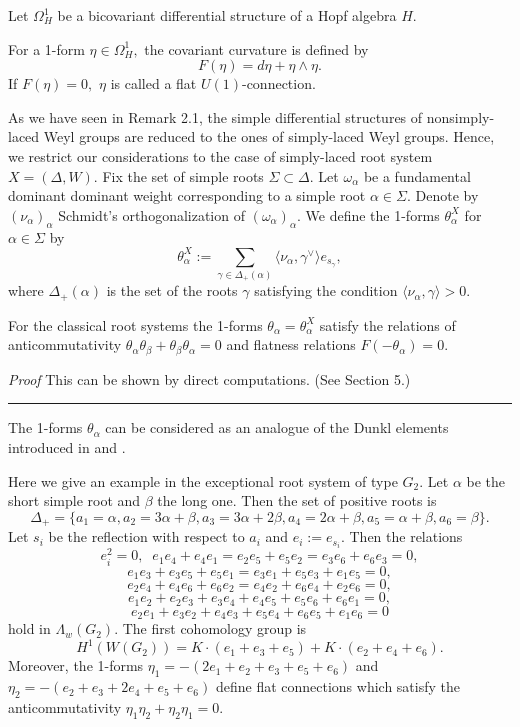 Let $\Omega^1_H$ be a bicovariant differential structure 
of a Hopf algebra $H.$ 
\begin{dfn}
For a 1-form $\eta \in \Omega^1_H,$ the covariant 
curvature is defined by 
\[ F(\eta)= d \eta + \eta \wedge \eta . \] 
If $F(\eta)= 0,$ $\eta$ is called a flat $U(1)$-connection. 
\end{dfn} 
As we have seen in Remark 2.1, the simple differential 
structures of nonsimply-laced Weyl groups are reduced to 
the ones of simply-laced Weyl groups. Hence, we restrict 
our considerations to the case of simply-laced root system 
$X=(\Delta, W).$ Fix the set of simple roots $\Sigma \subset 
\Delta.$ 
Let $\omega_{\alpha}$ be a fundamental dominant dominant 
weight corresponding to a simple root $\alpha \in \Sigma.$
Denote by $(\nu_{\alpha})_{\alpha}$ Schmidt's orthogonalization of 
$(\omega_{\alpha})_{\alpha}$. 
We define the 1-forms $\theta_{\alpha}^X$ for $\alpha \in \Sigma$ 
by 
\[ \theta_{\alpha}^X:= \sum_{\gamma \in \Delta_+(\alpha)} \langle
\nu_{\alpha}, \gamma^{\vee} \rangle e_{s_{\gamma}} ,\] 
where $\Delta_+(\alpha)$ is the set of the roots $\gamma$ satisfying 
the condition $\langle \nu_{\alpha} , \gamma \rangle >0.$ 
\begin{prop}
For the classical root systems the 1-forms 
$\theta_{\alpha}=\theta_{\alpha}^X$ satisfy 
the relations of anticommutativity 
$\theta_{\alpha}\theta_{\beta}+\theta_{\beta}\theta_{\alpha}=0$ 
and flatness relations $F(-\theta_{\alpha})=0.$  
\end{prop}
{\it Proof} \quad This can be shown by direct computations. (See Section 
5.) \quad \rule{3mm}{3mm} 
\begin{rem}{\rm 
The 1-forms $\theta_{\alpha}$ can be considered as an 
analogue of the Dunkl elements introduced in \cite{FK} and \cite{KM}. 
}
\end{rem}
\begin{ex}
{\rm Here we give an example in the exceptional root system of 
type $G_2.$ Let $\alpha$ be the short simple root and $\beta$ the long 
one. Then the set of positive roots is 
\[ \Delta_+= \{ a_1= \alpha, a_2= 3\alpha+ \beta, a_3= 3\alpha+ 2\beta, 
a_4= 2\alpha+\beta, a_5=\alpha+\beta,a_6=\beta \} . \] 
Let $s_i$ be the reflection with respect to $a_i$ and 
$e_i:=e_{s_i}.$ Then the relations 
\[ e_i^2=0, \; \; e_1e_4+e_4e_1=e_2e_5+e_5e_2=e_3e_6+e_6e_3=0, \]
\[ e_1e_3+e_3e_5+e_5e_1=e_3e_1+e_5e_3+e_1e_5=0, \] 
\[ e_2e_4+e_4e_6+e_6e_2=e_4e_2+e_6e_4+e_2e_6=0, \] 
\[ e_1e_2+e_2e_3+e_3e_4+e_4e_5+e_5e_6+e_6e_1=0, \] 
\[ e_2e_1+e_3e_2+e_4e_3+e_5e_4+e_6e_5+e_1e_6=0 \] 
hold in $\Lambda_w(G_2).$ The first cohomology group is 
\[ H^1(W(G_2))= K\cdot (e_1+e_3+e_5)+K\cdot (e_2+e_4+e_6). \] 
Moreover, the 1-forms $\eta_1=-(2e_1+e_2+e_3+e_5+e_6)$ and 
$\eta_2=-(e_2+e_3+2e_4+e_5+e_6)$ define flat connections which 
satisfy the anticommutativity $\eta_1 \eta_2+\eta_2 \eta_1=0.$ 
}
\end{ex}
